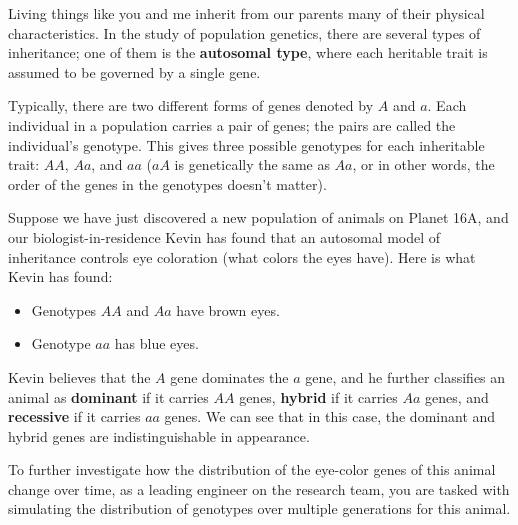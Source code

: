 
Living things like you and me inherit from our parents many of their physical characteristics. In the study of population genetics, there are several types of inheritance; one of them is the \textbf{autosomal type}, where each heritable trait is assumed to be governed by a single gene. 

Typically, there are two different forms of genes denoted by $A$ and $a$. Each individual in a population carries a pair of genes; the pairs are called the individual's genotype. This gives three possible genotypes for each inheritable trait: $AA$, $Aa$, and $aa$ ($aA$ is genetically the same as $Aa$, or in other words, the order of the genes in the genotypes doesn't matter).

Suppose we have just discovered a new population of animals on Planet 16A, and our biologist-in-residence Kevin has found that an autosomal model of inheritance controls eye coloration (what colors the eyes have). Here is what Kevin has found:
\begin{itemize}
    \item Genotypes $AA$ and $Aa$ have brown eyes.
    \item Genotype $aa$ has blue eyes.
\end{itemize}

Kevin believes that the $A$ gene dominates the $a$ gene, and he further classifies an animal as \textbf{dominant} if it carries $AA$ genes, \textbf{hybrid} if it carries $Aa$ genes, and \textbf{recessive} if it carries $aa$ genes. We can see that in this case, the dominant and hybrid genes are indistinguishable in appearance.

To further investigate how the distribution of the eye-color genes of this animal change over time, as a leading engineer on the research team, you are tasked with simulating the distribution of genotypes over multiple generations for this animal.

